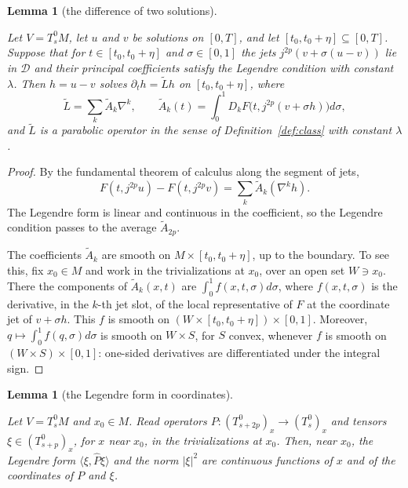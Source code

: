 \documentclass[11pt,reqno]{amsart}
\newtheorem{lemma}[theorem]{Lemma}
\theoremstyle{definition}
\theoremstyle{remark}
\newcommand{\Dom}{\mathcal{D}}
\newcommand{\ip}[2]{\langle #1,#2\rangle}
\newcommand{\abs}[1]{\lvert #1\rvert}
\newcommand{\hatP}{\widehat{P}}
\newcommand{\lean}[1]{}
\newcommand{\uses}[1]{}
\numberwithin{equation}{section}
\begin{document}
\begin{lemma}[the difference of two solutions]\label{lem:difference}
\lean{ShortTime.EquationData.exists_linearized, ShortTime.EquationData.F_sub_eq_sum_avg, ShortTime.legendreAt_avgFib, ShortTime.EquationData.exists_avg_coeff, ShortTime.EquationData.contMDiffOn_opFieldOf_avg, ShortTime.EquationData.coordP_avg, ShortTime.EquationData.contMDiffOn_avgIntegrand, ShortTime.EquationData.trivAt_partialDeriv, ShortTime.trivAt_opFieldOf, ShortTime.EquationData.contDiffAt_Fmod, ShortTime.contDiffOn_integral_Icc, ShortTime.contMDiffOn_integral_Icc}
\uses{def:data, def:solution, def:linearization, def:legendre, def:class}
Let $V=T^0_sM$, let $u$ and $v$ be solutions on $[0,T]$, and let $[t_0,t_0+\eta]\subseteq[0,T]$.
Suppose that for $t\in[t_0,t_0+\eta]$ and $\sigma\in[0,1]$ the jets $j^{2p}(v+\sigma(u-v))$ lie in
$\Dom$ and their principal coefficients satisfy the Legendre condition with constant $\lambda$. Then
$h=u-v$ solves $\partial_th=\tilde Lh$ on $[t_0,t_0+\eta]$, where
\[
  \tilde L=\sum_k\tilde A_k\nabla^k,\qquad
  \tilde A_k(t)=\int_0^1D_kF\bigl(t,j^{2p}(v+\sigma h)\bigr)d\sigma,
\]
and $\tilde L$ is a parabolic operator in the sense of Definition~\ref{def:class} with constant
$\lambda$.
\end{lemma}

\begin{proof}
By the fundamental theorem of calculus along the segment of jets,
\[
  F(t,j^{2p}u)-F(t,j^{2p}v)=\sum_k\tilde A_k(\nabla^kh).
\]
The Legendre form is linear and continuous
in the coefficient, so the Legendre condition passes to the average $\tilde A_{2p}$.

The coefficients $\tilde A_k$ are smooth on $M\times[t_0,t_0+\eta]$, up to the boundary. To see this,
fix $x_0\in M$ and work in the trivializations at $x_0$, over an open set $W\ni x_0$. There the
components of $\tilde A_k(x,t)$ are $\int_0^1f(x,t,\sigma)d\sigma$, where $f(x,t,\sigma)$ is the
derivative, in the $k$-th jet slot, of the local representative of $F$ at the coordinate jet of
$v+\sigma h$. This $f$ is smooth on $(W\times[t_0,t_0+\eta])\times[0,1]$. Moreover,
$q\mapsto\int_0^1f(q,\sigma)d\sigma$ is smooth on $W\times S$, for $S$ convex, whenever $f$ is smooth
on $(W\times S)\times[0,1]$: one-sided derivatives are differentiated under the integral sign.
\end{proof}

\begin{lemma}[the Legendre form in coordinates]\label{lem:legendre-coord}
\lean{ShortTime.exists_legendre_coord, ShortTime.legendreForm_expand, ShortTime.continuous_legendreForm_sections, ShortTime.exists_opField_frame, ShortTime.exists_tensor_frame, ShortTime.EquationData.principal_eq_fibMap}
\uses{def:legendre, lem:ibp}
Let $V=T^0_sM$ and $x_0\in M$. Read operators $P\colon(T^0_{s+2p})_x\to(T^0_s)_x$ and tensors
$\xi\in(T^0_{s+p})_x$, for $x$ near $x_0$, in the trivializations at $x_0$. Then, near $x_0$, the
Legendre form $\ip{\xi}{\hatP\xi}$ and the norm $\abs\xi^2$ are continuous functions of $x$ and of
the coordinates of $P$ and $\xi$.
\end{lemma}
\end{document}
